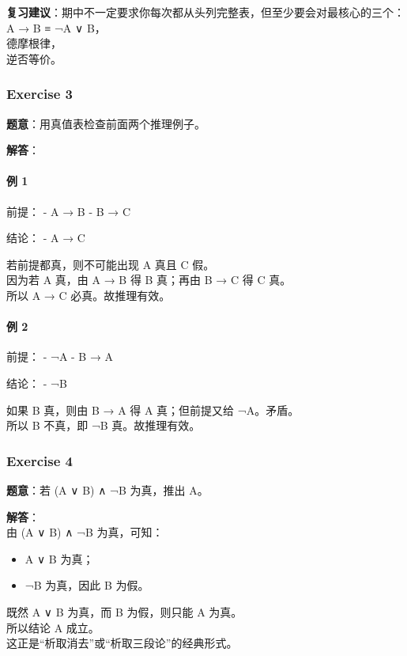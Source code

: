 \documentclass[
  11pt,
]{article}
\providecommand{\tightlist}{%
  \setlength{\itemsep}{0pt}\setlength{\parskip}{0pt}}
\begin{document}
\textbf{复习建议}：期中不一定要求你每次都从头列完整表，但至少要会对最核心的三个：\\
A → B ≡ ¬A ∨ B，\\
德摩根律，\\
逆否等价。

\subsubsection{Exercise 3}\label{exercise-3}

\textbf{题意}：用真值表检查前面两个推理例子。

\textbf{解答}：

\paragraph{例 1}\label{ux4f8b-1}

前提： - A → B - B → C

结论： - A → C

若前提都真，则不可能出现 A 真且 C 假。\\
因为若 A 真，由 A → B 得 B 真；再由 B → C 得 C 真。\\
所以 A → C 必真。故推理有效。

\paragraph{例 2}\label{ux4f8b-2}

前提： - ¬A - B → A

结论： - ¬B

如果 B 真，则由 B → A 得 A 真；但前提又给 ¬A。矛盾。\\
所以 B 不真，即 ¬B 真。故推理有效。

\subsubsection{Exercise 4}\label{exercise-4}

\textbf{题意}：若 (A ∨ B) ∧ ¬B 为真，推出 A。

\textbf{解答}：\\
由 (A ∨ B) ∧ ¬B 为真，可知：

\begin{itemize}
\tightlist
\item
  A ∨ B 为真；
\item
  ¬B 为真，因此 B 为假。
\end{itemize}

既然 A ∨ B 为真，而 B 为假，则只能 A 为真。\\
所以结论 A 成立。\\
这正是``析取消去''或``析取三段论''的经典形式。
\end{document}
